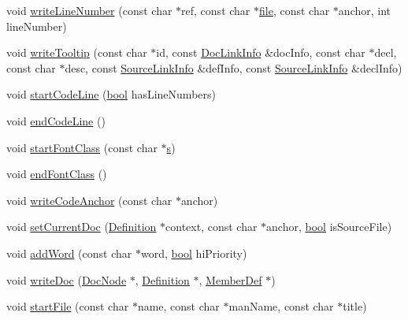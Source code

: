 \begin{DoxyCompactItemize}
\item 
void \hyperlink{class_html_generator_a042fed032c729b4a5e44b9a7c86385a7}{write\+Line\+Number} (const char $\ast$ref, const char $\ast$\hyperlink{class_output_generator_aed5ad11c3844cdf71ec6fee6c1c84286}{file}, const char $\ast$anchor, int line\+Number)
\item 
void \hyperlink{class_html_generator_ad21a9b170d8f644619f287a233c6b549}{write\+Tooltip} (const char $\ast$id, const \hyperlink{struct_doc_link_info}{Doc\+Link\+Info} \&doc\+Info, const char $\ast$decl, const char $\ast$desc, const \hyperlink{struct_source_link_info}{Source\+Link\+Info} \&def\+Info, const \hyperlink{struct_source_link_info}{Source\+Link\+Info} \&decl\+Info)
\item 
void \hyperlink{class_html_generator_ab89f82b354a626585bf1ff5a793ad5db}{start\+Code\+Line} (\hyperlink{qglobal_8h_a1062901a7428fdd9c7f180f5e01ea056}{bool} has\+Line\+Numbers)
\item 
void \hyperlink{class_html_generator_a509e9b78f035f58e533cef4f79bf5401}{end\+Code\+Line} ()
\item 
void \hyperlink{class_html_generator_aa600cc24896060a68612e3db6efb7dbf}{start\+Font\+Class} (const char $\ast$\hyperlink{060__command__switch_8tcl_a011c73f2dbb87635a3b4206c72355f6e}{s})
\item 
void \hyperlink{class_html_generator_aca25e58aa19b44b41de489dc966e4b5d}{end\+Font\+Class} ()
\item 
void \hyperlink{class_html_generator_a9e2528347c04b6f07dd9263441dbcf4f}{write\+Code\+Anchor} (const char $\ast$anchor)
\item 
void \hyperlink{class_html_generator_a36829b23efe3855373db99bac3e9998d}{set\+Current\+Doc} (\hyperlink{class_definition}{Definition} $\ast$context, const char $\ast$anchor, \hyperlink{qglobal_8h_a1062901a7428fdd9c7f180f5e01ea056}{bool} is\+Source\+File)
\item 
void \hyperlink{class_html_generator_ab80e35069bed2aadfd28912897ff59c8}{add\+Word} (const char $\ast$word, \hyperlink{qglobal_8h_a1062901a7428fdd9c7f180f5e01ea056}{bool} hi\+Priority)
\item 
void \hyperlink{class_html_generator_afb2332948f5e53d82d8299fe158da0a9}{write\+Doc} (\hyperlink{class_doc_node}{Doc\+Node} $\ast$, \hyperlink{class_definition}{Definition} $\ast$, \hyperlink{class_member_def}{Member\+Def} $\ast$)
\item 
void \hyperlink{class_html_generator_ab0a5eb800f902fc308dd418901bf8c0f}{start\+File} (const char $\ast$name, const char $\ast$man\+Name, const char $\ast$title)

\end{DoxyCompactItemize}
